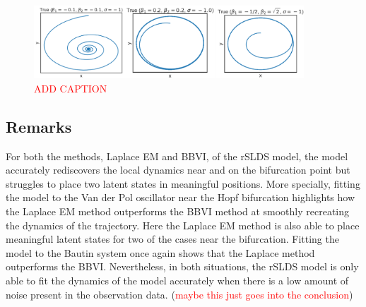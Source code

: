 \begin{figure}
    \centering
    \includegraphics[width=0.9\textwidth,height=\textwidth,keepaspectratio]{./Figures/bautin-true.png}
    \caption{\textcolor{red}{ADD CAPTION}}
    \label{fig}
\end{figure}

\subsection{Remarks}
For both the methods, Laplace EM and BBVI, of the rSLDS model, the model accurately rediscovers the local dynamics near and on the bifurcation point but struggles to place two latent states in meaningful positions. More specially, fitting the model to the Van der Pol oscillator near the Hopf bifurcation highlights how the Laplace EM method outperforms the BBVI method at smoothly recreating the dynamics of the trajectory. Here the Laplace EM method is also able to place meaningful latent states for two of the cases near the bifurcation. Fitting the model to the Bautin system once again shows that the Laplace method outperforms the BBVI. Nevertheless, in both situations, the rSLDS model is only able to fit the dynamics of the model accurately when there is a low amount of noise present in the observation data. (\textcolor{red}{maybe this just goes into the conclusion})

